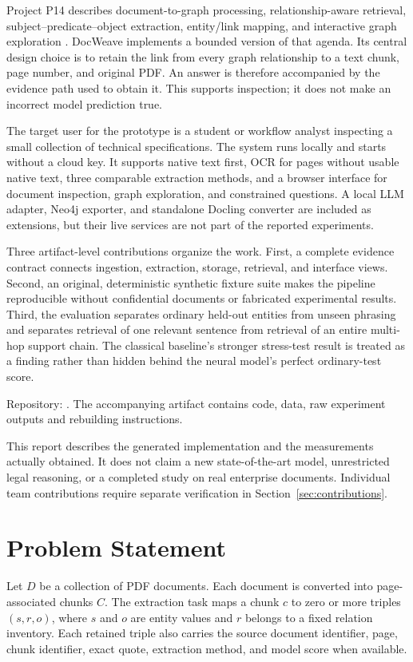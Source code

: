 \documentclass[conference]{IEEEtran}
\begin{document}
Project P14 describes document-to-graph processing, relationship-aware retrieval, subject--predicate--object extraction, entity/link mapping, and interactive graph exploration \cite{course}. DocWeave implements a bounded version of that agenda. Its central design choice is to retain the link from every graph relationship to a text chunk, page number, and original PDF. An answer is therefore accompanied by the evidence path used to obtain it. This supports inspection; it does not make an incorrect model prediction true.

The target user for the prototype is a student or workflow analyst inspecting a small collection of technical specifications. The system runs locally and starts without a cloud key. It supports native text first, OCR for pages without usable native text, three comparable extraction methods, and a browser interface for document inspection, graph exploration, and constrained questions. A local LLM adapter, Neo4j exporter, and standalone Docling converter are included as extensions, but their live services are not part of the reported experiments.

Three artifact-level contributions organize the work. First, a complete evidence contract connects ingestion, extraction, storage, retrieval, and interface views. Second, an original, deterministic synthetic fixture suite makes the pipeline reproducible without confidential documents or fabricated experimental results. Third, the evaluation separates ordinary held-out entities from unseen phrasing and separates retrieval of one relevant sentence from retrieval of an entire multi-hop support chain. The classical baseline's stronger stress-test result is treated as a finding rather than hidden behind the neural model's perfect ordinary-test score.

Repository: \texttt{\RepositoryURL}. The accompanying artifact contains code, data, raw experiment outputs and rebuilding instructions.

This report describes the generated implementation and the measurements actually obtained. It does not claim a new state-of-the-art model, unrestricted legal reasoning, or a completed study on real enterprise documents. Individual team contributions require separate verification in Section~\ref{sec:contributions}.

\section{Problem Statement}
Let $D$ be a collection of PDF documents. Each document is converted into page-associated chunks $C$. The extraction task maps a chunk $c$ to zero or more triples $(s,r,o)$, where $s$ and $o$ are entity values and $r$ belongs to a fixed relation inventory. Each retained triple also carries the source document identifier, page, chunk identifier, exact quote, extraction method, and model score when available.
\end{document}

